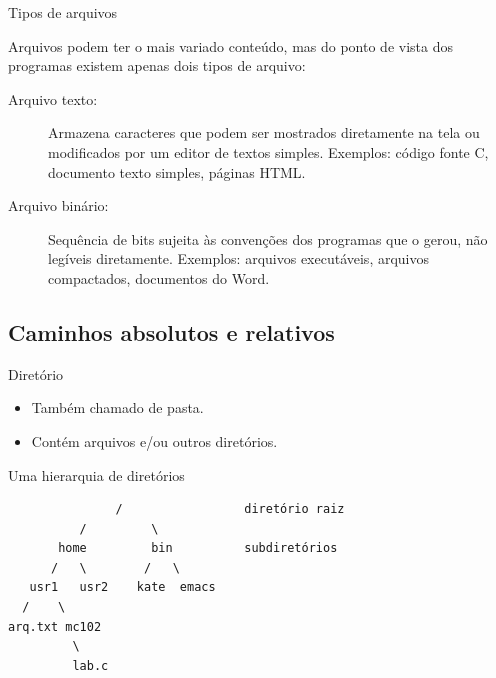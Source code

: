\documentclass[handout]{beamer}
\begin{document}
\begin{frame}{Tipos de arquivos}

    Arquivos podem ter o mais variado conteúdo, mas do ponto de vista
    dos programas existem apenas dois tipos de arquivo:

    \begin{block}{}
        \begin{description}
            \item[Arquivo texto:] Armazena caracteres que podem ser mostrados
            diretamente na tela ou modificados por um editor de textos
            simples. Exemplos: código fonte C, documento texto simples,
            páginas HTML.

            \item[Arquivo binário:] Sequência de bits sujeita às convenções
            dos programas que o gerou, não legíveis diretamente.  Exemplos:
            arquivos executáveis, arquivos compactados, documentos do Word.
        \end{description}
    \end{block}

\end{frame}

\subsection{Caminhos absolutos e relativos}

\begin{frame}[fragile]{Diretório}

    \begin{itemize}
        \item Também chamado de pasta.
        \item Contém arquivos e/ou outros diretórios.
    \end{itemize}
    \begin{block}{Uma hierarquia de diretórios}

\begin{verbatim}
               /                 diretório raiz
          /         \
       home         bin          subdiretórios
      /   \        /   \
   usr1   usr2    kate  emacs
  /    \
arq.txt mc102
         \
         lab.c
\end{verbatim}
    \end{block}

\end{frame}
\end{document}
